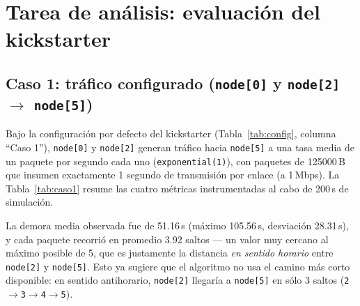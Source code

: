\documentclass[10pt,letterpaper,twocolumn]{article}
\newcommand{\coltablesetup}{%
  \scriptsize
  \setlength{\tabcolsep}{3pt}%
  \renewcommand{\arraystretch}{1.08}%
}
\begin{document}
\begin{table}[!ht]
  \centering
  \caption{Métricas instrumentadas en el simulador.}
  \label{tab:metricas}
  \coltablesetup
\end{table}

\section{Tarea de análisis: evaluación del kickstarter}
\label{sec:analisis}

\subsection{Caso 1: tráfico configurado (\texttt{node[0]} y \texttt{node[2]} $\rightarrow$ \texttt{node[5]})}

Bajo la configuración por defecto del kickstarter (Tabla~\ref{tab:config},
columna ``Caso 1''), \texttt{node[0]} y \texttt{node[2]} generan tráfico hacia
\texttt{node[5]} a una tasa media de un paquete por segundo cada uno
(\texttt{exponential(1)}), con paquetes de 125000\,B que insumen exactamente 1
segundo de transmisión por enlace (a 1\,Mbps). La Tabla~\ref{tab:caso1} resume
las cuatro métricas instrumentadas al cabo de 200\,s de simulación.

La demora media observada fue de 51.16\,s (máximo 105.56\,s, desviación
28.31\,s), y cada paquete recorrió en promedio 3.92 saltos --- un valor muy
cercano al máximo posible de 5, que es justamente la distancia \emph{en sentido
horario} entre \texttt{node[2]} y \texttt{node[5]}. Esto ya sugiere que el
algoritmo no usa el camino más corto disponible: en sentido antihorario,
\texttt{node[2]} llegaría a \texttt{node[5]} en sólo 3 saltos
(\texttt{2}$\to$\texttt{3}$\to$\texttt{4}$\to$\texttt{5}).
\end{document}
